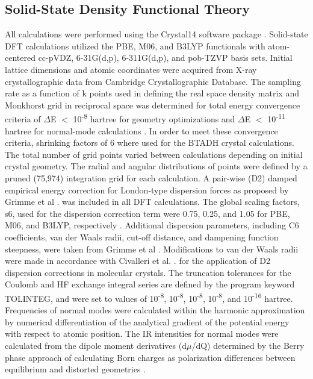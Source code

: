 \subsection{Solid-State Density Functional Theory}

All calculations were performed using the Crystal14 software package \citep{Dovesi2014,Dovesi2017}. Solid-state DFT calculations utilized the PBE,\citep{perdew} M06,\citep{zhao_m06_2008} and B3LYP \citep{Lee_1988,becke_density-functional_1993} functionals with atom-centered cc-pVDZ,\cite{dunning_gaussian_1989} 6-31G(d,p),\citep{hehre_selfconsistent_1972,Hariharan1973TheIO} 6-311G(d,p),\citep{krishnan_self-consistent_1980} and pob-TZVP \citep{peintinger_consistent_2013} basis sets. Initial lattice dimensions and atomic coordinates were acquired from X-ray crystallographic data from Cambridge Crystallographic Database\citep{nichol_btadh_2005,groom_cambridge_2016}. The sampling rate as a function of k points used in defining the real space density matrix and Monkhorst grid in reciprocal space was determined for total energy convergence criteria of \(\Delta\)E \(<\) 10\textsuperscript{-8} hartree for geometry optimizations and \(\Delta\)E \(<\) 10\textsuperscript{-11} hartree for normal-mode calculations \citep{gilat_analysis_1972,monkhorst}. In order to meet these convergence criteria, shrinking factors of 6 where used for the BTADH crystal calculations. The total number of grid points varied between calculations depending on initial crystal geometry. The radial and angular distributions of points were defined by a pruned (75,974) integration grid for each calculation. A pair-wise (D2) damped empirical energy correction for London-type dispersion forces as proposed by Grimme et al \citep{grimme_accurate_2004,grimme_semiempirical_2006}. was included in all DFT calculations. The global scaling factors, s6, used for the dispersion correction term were 0.75, 0.25, and 1.05 for PBE, M06, and B3LYP, respectively \citep{zhao_m06_2008,grimme_accurate_2004,grimme_semiempirical_2006,Karton_2009}. Additional dispersion parameters, including C6 coefficients, van der Waals radii, cut-off distance, and dampening function steepness, were taken from Grimme et al \citep{grimme_accurate_2004,grimme_semiempirical_2006}. Modifications to van der Waals radii were made in accordance with Civalleri et al. \citep{civalleri_b3lyp_2008}. for the application of D2 dispersion corrections in molecular crystals. The truncation tolerances for the Coulomb and HF exchange integral series are defined by the program keyword TOLINTEG, and were set to values of 10\textsuperscript{-8}, 10\textsuperscript{-8}, 10\textsuperscript{-8}, 10\textsuperscript{-8}, and 10\textsuperscript{-16} hartree. Frequencies of normal modes were calculated within the harmonic approximation by numerical differentiation of the analytical gradient of the potential energy with respect to atomic position\citep{pascale_calculation_2004}. The IR intensities for normal modes were calculated from the dipole moment derivatives (d$\mu$/dQ) determined by the Berry phase approach of calculating Born charges as polarization differences between equilibrium and distorted geometries \citep{zicovichwilson_calculation_2004}.

